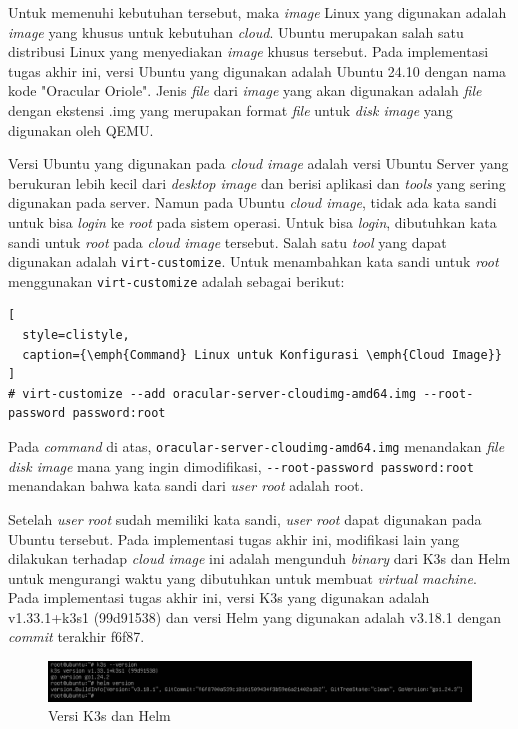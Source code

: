 Untuk memenuhi kebutuhan tersebut, maka \emph{image} Linux yang digunakan
adalah \emph{image} yang khusus untuk kebutuhan \emph{cloud}. Ubuntu merupakan
salah satu distribusi Linux yang menyediakan \emph{image} khusus tersebut.
Pada implementasi tugas akhir ini, versi Ubuntu yang digunakan adalah Ubuntu 24.10
dengan nama kode "Oracular Oriole". Jenis \emph{file} dari \emph{image} yang akan digunakan
adalah \emph{file} dengan ekstensi .img yang merupakan format \emph{file} untuk \emph{disk image}
yang digunakan oleh QEMU.

Versi Ubuntu yang digunakan pada \emph{cloud image} adalah versi Ubuntu Server yang
berukuran lebih kecil dari \emph{desktop image} dan berisi aplikasi dan \emph{tools}
yang sering digunakan pada server. Namun pada Ubuntu \emph{cloud image}, tidak ada
kata sandi untuk bisa \emph{login} ke \emph{root} pada sistem operasi. Untuk bisa \emph{login},
dibutuhkan kata sandi untuk \emph{root} pada \emph{cloud image} tersebut. Salah satu \emph{tool} yang
dapat digunakan adalah \lstinline{virt-customize}.
Untuk menambahkan kata sandi untuk \emph{root} menggunakan \lstinline{virt-customize} adalah
sebagai berikut:

\begin{lstlisting}[
  style=clistyle,
  caption={\emph{Command} Linux untuk Konfigurasi \emph{Cloud Image}}
]
# virt-customize --add oracular-server-cloudimg-amd64.img --root-password password:root
\end{lstlisting}

Pada \emph{command} di atas, \lstinline{oracular-server-cloudimg-amd64.img} menandakan \emph{file disk image}
mana yang ingin dimodifikasi, \lstinline{--root-password password:root} menandakan bahwa kata sandi
dari \emph{user root} adalah root.

Setelah \emph{user root} sudah memiliki kata sandi, \emph{user root} dapat digunakan
pada Ubuntu tersebut. Pada implementasi tugas akhir ini, modifikasi lain yang dilakukan
terhadap \emph{cloud image} ini adalah mengunduh \emph{binary} dari K3s dan Helm untuk mengurangi
waktu yang dibutuhkan untuk membuat \emph{virtual machine}. Pada implementasi tugas akhir ini,
versi K3s yang digunakan adalah v1.33.1+k3s1 (99d91538) dan versi Helm yang digunakan adalah
v3.18.1 dengan \emph{commit} terakhir f6f87.

\begin{figure}[H]
  \centering
  \includegraphics[scale=0.4]{gambar/k3s-helm-version.png}
  \caption{Versi K3s dan Helm}
  \label{fig:k3s-helm-version}
\end{figure}

